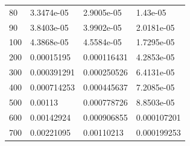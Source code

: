 \begin{center}
\begin{longtable}{l|l|l|l}
80                                                     & 3.3474e-05                                                        & 2.9005e-05                                               & 1.43e-05                                                           \\
90                                                     & 3.8403e-05                                                        & 3.9902e-05                                               & 2.0181e-05                                                         \\
100                                                    & 4.3868e-05                                                        & 4.5584e-05                                               & 1.7295e-05                                                         \\
200                                                    & 0.00015195                                                        & 0.000116431                                              & 4.2853e-05                                                         \\
300                                                    & 0.000391291                                                       & 0.000250526                                              & 6.4131e-05                                                         \\
400                                                    & 0.000714253                                                       & 0.000445637                                              & 7.2085e-05                                                         \\
500                                                    & 0.00113                                                           & 0.000778726                                              & 8.8503e-05                                                         \\
600                                                    & 0.00142924                                                        & 0.000906855                                              & 0.000107201                                                        \\
700                                                    & 0.00221095                                                        & 0.00110213                                               & 0.000199253                                                        \\

\end{longtable}
\end{center}

